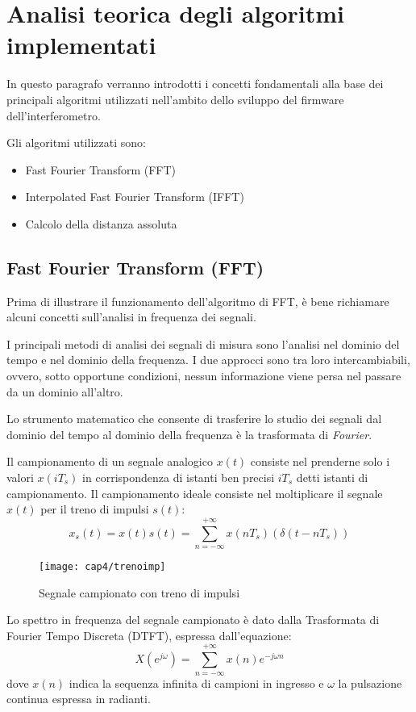 \section{Analisi teorica degli algoritmi implementati}
In questo paragrafo verranno introdotti i concetti fondamentali alla base dei principali algoritmi utilizzati nell'ambito dello sviluppo del firmware dell'interferometro.

Gli algoritmi utilizzati sono:
\begin{itemize}
	\item Fast Fourier Transform (FFT)
	\item Interpolated Fast Fourier Transform (IFFT)
	\item Calcolo della distanza assoluta
\end{itemize}

\subsection{Fast Fourier Transform (FFT)}
Prima di illustrare il funzionamento dell'algoritmo di FFT, è bene richiamare alcuni concetti sull'analisi in frequenza dei segnali.

I principali metodi di analisi dei segnali di misura sono l'analisi nel dominio del tempo e nel dominio della frequenza. I due approcci sono tra loro intercambiabili, ovvero, sotto opportune condizioni, nessun informazione viene persa nel passare da un dominio all'altro. 

Lo strumento matematico che consente di trasferire lo studio dei segnali dal dominio del tempo al dominio della frequenza è la trasformata di \textit{Fourier}.

Il campionamento di un segnale analogico $x(t)$ consiste nel prenderne solo i valori $x(iT_s)$ in corrispondenza di istanti ben precisi $iT_s$ detti istanti di campionamento. 
Il campionamento ideale consiste nel moltiplicare il segnale $x(t)$ per il treno di impulsi $s(t)$:
\begin{equation}
	x_s(t)=x(t) s(t) = \sum_{n=-\infty}^{+\infty} x(nT_s) (\delta (t-nT_s))
\end{equation}
\begin{figure}[H]  
  \begin{center}
    \texttt{[image: cap4/trenoimp]}
    \caption{Segnale campionato con treno di impulsi}
  \end{center}
\end{figure}

Lo spettro in frequenza del segnale campionato è dato dalla Trasformata di Fourier Tempo Discreta (DTFT), espressa dall'equazione: 
\begin{equation}
	X(e^{j\omega}) = \sum_{n=-\infty}^{+\infty} x(n)e^{-j\omega n}
\end{equation}
dove $x(n)$ indica la sequenza infinita di campioni in ingresso e $\omega$ la pulsazione continua espressa in radianti.

